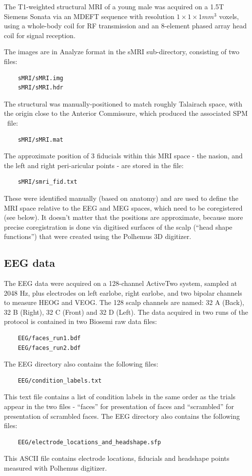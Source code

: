 The T1-weighted structural MRI of a young male was acquired on a 1.5T Siemens Sonata via an MDEFT sequence with resolution $1 \times 1 \times 1 mm^3$ voxels, using a whole-body coil for RF transmission and an 8-element phased array head coil for signal reception.

The images are in Analyze format in the sMRI sub-directory, consisting of two files:
\begin{verbatim}
    sMRI/sMRI.img
    sMRI/sMRI.hdr
\end{verbatim}
The structural was manually-positioned to match roughly Talairach space, with the origin close to the Anterior Commissure, which produced the associated SPM \matlab\ file:
\begin{verbatim}
    sMRI/sMRI.mat
\end{verbatim}
The approximate position of 3 fiducials within this MRI space - the nasion, and the left and right peri-aricular points - are stored in the file:
\begin{verbatim}
    sMRI/smri_fid.txt
\end{verbatim}
These were identified manually (based on anatomy) and are used to define the MRI space relative to the EEG and MEG spaces, which need to be coregistered (see below). It doesn't matter that the positions are approximate, because more precise coregistration is done via digitised surfaces of the scalp (``head shape functions'') that were created using the Polhemus 3D digitizer.

\subsection{EEG data}

The EEG data were acquired on a 128-channel ActiveTwo system, sampled at 2048 Hz, plus electrodes on left earlobe, right earlobe, and two bipolar channels to measure HEOG and VEOG. The 128 scalp channels are named: 32 A (Back), 32 B (Right), 32 C (Front) and 32 D (Left). The data acquired in two runs of the protocol is contained in two Biosemi raw data files:
\begin{verbatim}
    EEG/faces_run1.bdf
    EEG/faces_run2.bdf
\end{verbatim}

The EEG directory also contains the following files:
\begin{verbatim}
    EEG/condition_labels.txt
\end{verbatim}
This text file contains a list of condition labels in the same order as the trials appear in the two files - ``faces'' for presentation of faces and ``scrambled'' for presentation of scrambled faces.
The EEG directory also contains the following files:
\begin{verbatim}
    EEG/electrode_locations_and_headshape.sfp
\end{verbatim}
This ASCII file contains electrode locations, fiducials and headshape points measured with Polhemus digitizer.

